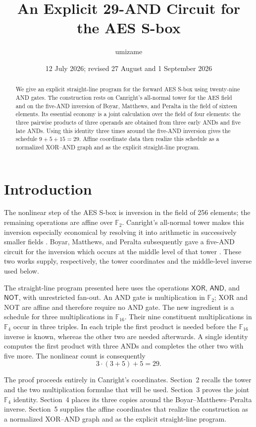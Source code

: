 \documentclass[11pt]{article}
\title{\bfseries An Explicit 29-AND Circuit for the AES S-box}
\author{umizame}
\date{12 July 2026; revised 27 August and 1 September 2026}
\newcommand{\F}{\mathbb F}
\newcommand{\AND}{\mathsf{AND}}
\newcommand{\XOR}{\mathsf{XOR}}
\begin{document}
\maketitle

\begin{abstract}
We give an explicit straight-line program for the forward AES S-box using
twenty-nine AND gates.  The construction rests on Canright's all-normal
tower for the AES field and on the five-AND inversion of Boyar, Matthews,
and Peralta in the field of sixteen elements.  Its essential economy is a
joint calculation over the field of four elements: the three pairwise
products of three operands are obtained from three early ANDs and five late
ANDs.  Using this identity three times around the five-AND inversion gives
the schedule \(9+5+15=29\).  Affine coordinate data then realize this
schedule as a normalized XOR--AND graph and as the explicit straight-line
program.
\end{abstract}

\section{Introduction}

The nonlinear step of the AES S-box is inversion in the field of 256
elements; the remaining operations are affine over \(\F_2\).  Canright's
all-normal tower makes this inversion especially economical by resolving it
into arithmetic in successively smaller fields \cite[Sec.~2]{canright}.  Boyar,
Matthews, and Peralta subsequently gave a five-AND circuit for the inversion
which occurs at the middle level of that tower
\cite[Sec.~2.1, Fig.~2]{bmp}.  These two works
supply, respectively, the tower coordinates and the middle-level inverse
used below.

The straight-line program presented here uses the operations \(\XOR\),
\(\AND\), and \(\mathsf{NOT}\), with unrestricted fan-out.  An AND gate is
multiplication in \(\F_2\); XOR and NOT are affine and therefore require no
AND gate.  The new ingredient is a schedule for three multiplications in
\(\F_{16}\).  Their nine constituent multiplications in \(\F_4\) occur in
three triples.  In each triple the first product is needed before the
\(\F_{16}\) inverse is known, whereas the other two are needed afterwards.
A single identity computes the first product with three ANDs and completes
the other two with five more.  The nonlinear count is consequently
\[
  3\cdot(3+5)+5=29.
\]

The proof proceeds entirely in Canright's coordinates.  Section~2 recalls
the tower and the two multiplication formulae that will be used.
Section~3 proves the joint \(\F_4\) identity.  Section~4 places its three
copies around the Boyar--Matthews--Peralta inverse.  Section~5 supplies the
affine coordinates that realize the construction as a normalized XOR--AND
graph and as the explicit straight-line program.
\end{document}
